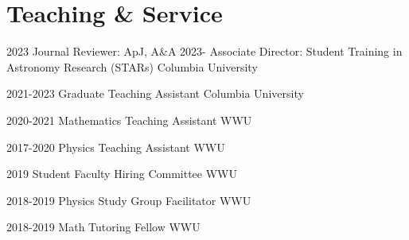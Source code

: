 \documentclass[]{scoggins-cv} %
\begin{document}
\section{Teaching \& Service}
\begin{entrylist}
\vspace{-0.5cm}


    \entry
    {2023}
    {Journal Reviewer: {\normalfont ApJ, A\&A}}
    {}
    {}
    \entry
    {2023-}
	{Associate Director: {\normalfont Student Training in Astronomy Research (STARs)}}
    {Columbia University}
	{}

    \entry
    {2021-2023}
    {Graduate Teaching Assistant}
    {Columbia University}
	{}


    \entry
    {2020-2021}
    {Mathematics Teaching Assistant}
    {WWU}
	{}


    \entry
    {2017-2020}
    {Physics Teaching Assistant}
    {WWU}
    {%
    }


    \entry
    {2019}
    {Student Faculty Hiring Committee}
    {WWU}
	{}


    \entry
    {2018-2019}
    {Physics Study Group Facilitator}
    {WWU}
    {%
    }


    \entry
    {2018-2019}
    {Math Tutoring Fellow}
    {WWU}
    {%
    }


\end{entrylist}


\vspace{-0.3cm}

\end{document}

